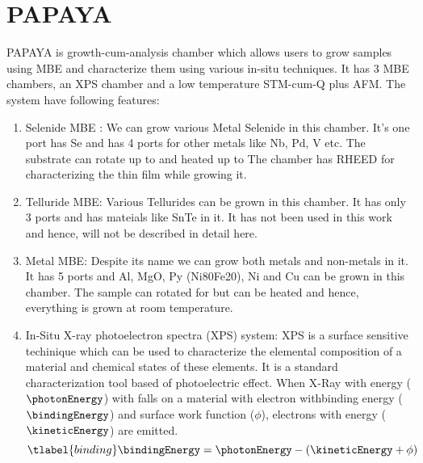 
\section{PAPAYA}
\label{papaya}


PAPAYA is growth-cum-analysis chamber which allows users to grow samples using
MBE and characterize them using various in-situ techniques. It has 3 MBE 
chambers, an XPS chamber and a low temperature STM-cum-Q plus AFM. The system 
have following features:

\begin{enumerate}
    \item Selenide MBE : We can grow various Metal Selenide in this chamber. 
    It's one port has Se and has 4 ports for other metals like Nb, Pd, V etc. 
    The substrate can rotate up to  and heated up to 
     The chamber has RHEED for characterizing the thin 
    film while growing it.

    \item Telluride MBE: Various Tellurides can be grown in this chamber. 
    It has only 3 ports and has mateials like SnTe in it. It has not been 
    used in this work and hence, will not be described in detail here.

    \item Metal MBE: Despite its name we can grow both metals and non-metals 
    in it. It has 5 ports and Al, MgO, Py (Ni80Fe20), Ni and Cu  can be grown 
    in this chamber. The sample can rotated for  but can 
    be heated and hence, everything is grown at room temperature.

    \item In-Situ X-ray photoelectron spectra (XPS) system: XPS is a surface 
    sensitive techinique which can be used to characterize the elemental 
    composition of a material and chemical states of these elements. It is 
    a standard characterization tool based of photoelectric effect. When 
    X-Ray with energy ($\photonEnergy$) with falls on a material with electron 
    withbinding energy ($\bindingEnergy$) and surface work function ($\phi$), 
    electrons with energy ($\kineticEnergy$) are emitted.
    \begin{equation}
        \tlabel{binding}
        \bindingEnergy = \photonEnergy - \left( \kineticEnergy + \phi \right) 
    \end{equation}


\end{enumerate}
